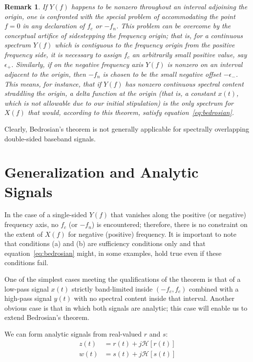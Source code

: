 \documentclass[12pt]{article}
\newtheorem{remark}{Remark}[section]
\begin{document}
\begin{remark}
If $Y(f)$ happens to be nonzero throughout an interval adjoining the origin, one is confronted with the special problem of accommodating the point $f = 0$ in any declaration of $f_c$ or $-f_n$. This problem can be overcome by the conceptual artifice of sidestepping the frequency origin; that is, for a continuous spectrum $Y(f)$ which is contiguous to the frequency origin from the positive frequency side, it is necessary to assign $f_c$ an arbitrarily small positive value, say $\epsilon_+$. Similarly, if on the negative frequency axis $Y(f)$ is nonzero on an interval adjacent to the origin, then $-f_n$ is chosen to be the small negative offset $-\epsilon_-$. This means, for instance, that if $Y(f)$ has nonzero continuous spectral content straddling the origin, a delta function at the origin (that is, a constant $x(t)$, which is not allowable due to our initial stipulation) is the only spectrum for $X(f)$ that would, according to this theorem, satisfy equation~\eqref{eq:bedrosian}.
\end{remark}

Clearly, Bedrosian’s theorem is not generally applicable for spectrally overlapping double-sided baseband signals.

\section{Generalization and Analytic Signals}

In the case of a single-sided $Y(f)$ that vanishes along the positive (or negative) frequency axis, no $f_c$ (or $-f_n$) is encountered; therefore, there is no constraint on the extent of $X(f)$ for negative (positive) frequency. It is important to note that conditions (a) and (b) are sufficiency conditions only and that equation~\eqref{eq:bedrosian} might, in some examples, hold true even if these conditions fail.

One of the simplest cases meeting the qualifications of the theorem is that of a low-pass signal $x(t)$ strictly band-limited inside $(-f_c, f_c)$ combined with a high-pass signal $y(t)$ with no spectral content inside that interval. Another obvious case is that in which both signals are analytic; this case will enable us to extend Bedrosian’s theorem.

We can form analytic signals from real-valued $r$ and $s$:
\begin{align}
z(t) &= r(t) + j \mathcal{H}[r(t)] \label{eq:analytic_z} \\
w(t) &= s(t) + j \mathcal{H}[s(t)] \label{eq:analytic_w}
\end{align}
\end{document}
